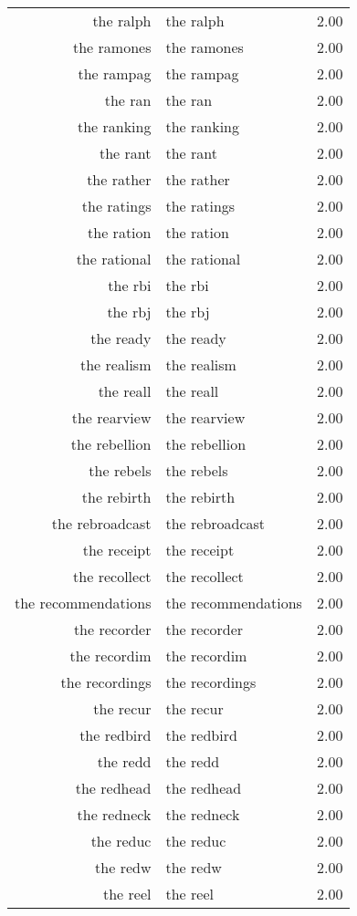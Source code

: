 \begin{table}[ht]
\begin{tabular}{rlr}
  the ralph & the ralph & 2.00 \\ 
  the ramones & the ramones & 2.00 \\ 
  the rampag & the rampag & 2.00 \\ 
  the ran & the ran & 2.00 \\ 
  the ranking & the ranking & 2.00 \\ 
  the rant & the rant & 2.00 \\ 
  the rather & the rather & 2.00 \\ 
  the ratings & the ratings & 2.00 \\ 
  the ration & the ration & 2.00 \\ 
  the rational & the rational & 2.00 \\ 
  the rbi & the rbi & 2.00 \\ 
  the rbj & the rbj & 2.00 \\ 
  the ready & the ready & 2.00 \\ 
  the realism & the realism & 2.00 \\ 
  the reall & the reall & 2.00 \\ 
  the rearview & the rearview & 2.00 \\ 
  the rebellion & the rebellion & 2.00 \\ 
  the rebels & the rebels & 2.00 \\ 
  the rebirth & the rebirth & 2.00 \\ 
  the rebroadcast & the rebroadcast & 2.00 \\ 
  the receipt & the receipt & 2.00 \\ 
  the recollect & the recollect & 2.00 \\ 
  the recommendations & the recommendations & 2.00 \\ 
  the recorder & the recorder & 2.00 \\ 
  the recordim & the recordim & 2.00 \\ 
  the recordings & the recordings & 2.00 \\ 
  the recur & the recur & 2.00 \\ 
  the redbird & the redbird & 2.00 \\ 
  the redd & the redd & 2.00 \\ 
  the redhead & the redhead & 2.00 \\ 
  the redneck & the redneck & 2.00 \\ 
  the reduc & the reduc & 2.00 \\ 
  the redw & the redw & 2.00 \\ 
  the reel & the reel & 2.00 \\ 

\end{tabular}
\end{table}

